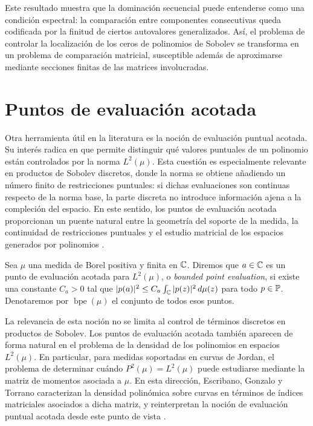 Este resultado muestra que la dominación secuencial puede entenderse como una
condición espectral: la comparación entre componentes consecutivas queda
codificada por la finitud de ciertos autovalores generalizados. Así, el problema
de controlar la localización de los ceros de polinomios de Sobolev se transforma
en un problema de comparación matricial, susceptible además de aproximarse
mediante secciones finitas de las matrices involucradas.

\section{Puntos de evaluación acotada}
\label{sec:puntos_bpe_intro}

Otra herramienta útil en la literatura es la noción de evaluación puntual
acotada. Su interés radica en que permite distinguir qué valores puntuales de un polinomio están controlados por la norma $L^2(\mu)$. Esta cuestión es
especialmente relevante en productos de Sobolev discretos, donde la norma se
obtiene añadiendo un número finito de restricciones puntuales: si dichas
evaluaciones son continuas respecto de la norma base, la parte discreta no
introduce información ajena a la compleción del espacio. En este sentido, los
puntos de evaluación acotada proporcionan un puente natural entre la geometría
del soporte de la medida, la continuidad de restricciones puntuales y el estudio
matricial de los espacios generados por polinomios
\cite{miller1999bounded,deB93,EGT23,EG25}.


\begin{defn}
	\label{def:bpe_intro}
	Sea \(\mu\) una medida de Borel positiva y finita en \(\mathbb{C}\). Diremos que
	\(a\in\mathbb{C}\) es un punto de evaluación acotada para \(L^2(\mu)\), o
	\emph{bounded point evaluation}, si existe una constante \(C_a>0\) tal que
	\(|p(a)|^2\le C_a \int_{\mathbb{C}}|p(z)|^2\,d\mu(z)\) para todo \(p\in\mathbb{P}\).
	Denotaremos por \(\operatorname{bpe}(\mu)\) el conjunto de todos esos puntos.
\end{defn}

La relevancia de esta noción no se limita al control de términos discretos en
productos de Sobolev. Los puntos de evaluación acotada también aparecen de forma natural en el problema de la densidad de los polinomios en espacios
\(L^2(\mu)\). En particular, para medidas soportadas en curvas de Jordan, el
problema de determinar cuándo \(P^2(\mu)=L^2(\mu)\) puede estudiarse mediante la matriz de momentos asociada a \(\mu\). En esta dirección, Escribano, Gonzalo y Torrano caracterizan la densidad polinómica sobre curvas en términos de índices matriciales asociados a dicha matriz, y reinterpretan la noción de evaluación puntual acotada desde este punto de vista \cite{escribano2019characterizationpolynomialdensitycurves}.


